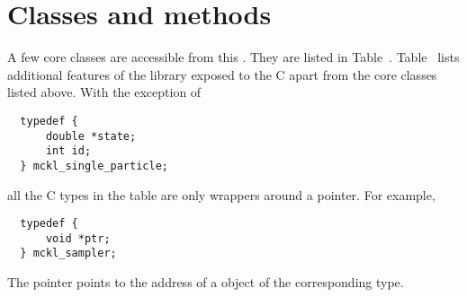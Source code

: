\section{Classes and methods}
\label{sec:Classes and methods}

A few core classes are accessible from this \api. They are listed in
Table~. Table~
lists additional features of the library exposed to the C \api apart from the
core classes listed above. With the exception of
\begin{Verbatim}
  typedef {
      double *state;
      int id;
  } mckl_single_particle;
\end{Verbatim}
all the C types in the table are only wrappers around a pointer. For example,
\begin{Verbatim}
  typedef {
      void *ptr;
  } mckl_sampler;
\end{Verbatim}
The pointer points to the address of a \cpp object of the corresponding type.

